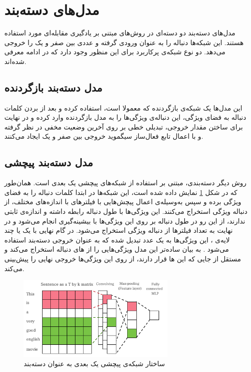  \section{مدل‌های دسته‌بند }\label{Model:Classifier}
مدل‌های دسته‌بند دو دسته‌ای در روش‌های مبتنی بر یادگیری مقابله‌ای مورد استفاده هستند. این شبکه‌ها دنباله را  به عنوان ورودی گرفته و عددی بین صفر و یک را خروجی می‌دهد. دو نوع شبکه‌ی پرکاربرد برای این منظور وجود دارد که در ادامه معرفی شده‌اند.
 \subsection{مدل‌ دسته‌بند بازگردنده}\label{Model:Classifier:RNN}
این مدل‌ها یک شبکه‌ی بازگردنده که معمولا
است، استفاده کرده و بعد از بردن کلمات دنباله به فضای ویژگی، این دنباله‌ی ویژگی‌ها را به مدل بازگردنده وارد کرده و در نهایت برای ساختن مقدار خروجی، تبدیلی خطی بر روی آخرین وضعیت مخفی در نظر گرفته و با اعمال تابع فعال‌ساز سیگموید خروجی بین صفر و یک ایجاد می‌کنند.
 \subsection{مدل‌ دسته‌بند پیچشی}\label{Model:Classifier:CNN}
روش دیگر دسته‌بندی، مبتنی بر استفاده از شبکه‌های پیچشی یک بعدی است.
همان‌طور که در شکل
\ref{Figure:DiscriminatorModel:Architecture:CNN}
نمایش داده شده است، این شبکه‌ها در ابتدا کلمات دنباله را به فضای ویژگی برده و سپس به‌وسیله‌ی اعمال پیچش‌هایی با  فیلترهای با
اندازه‌های مختلف، از دنباله ویژگی استخراج می‌کنند. این ویژگی‌ها با طول دنباله رابطه داشته و  اندازه‌ی ثابتی ندارند، از این رو در طول دنباله بر روی این ویژگی‌ها با بیشینه‌گیری 
انجام می‌شود و  در نهایت به تعداد فیلترها از دنباله ویژگی استخراج می‌شود. در گام نهایی با یک یا چند لایه‌ی
،
 این ویژگی‌ها به یک عدد تبدیل شده که به عنوان خروجی دسته‌بند استفاده می‌شود
\cite{Yoon14CNNClassifier}.
\newline
به بیان ساده‌تر این مدل ویژگی‌هایی را از 
های
دنباله استخراج می‌کند و مستقل از جایی که این
\ngram{}ها
قرار دارند، از روی این ویژگی‌ها خروجی نهایی را پیش‌بینی می‌کند.
  \begin{figure}[!htb]
  	\centering
  	\includegraphics[width=0.7\textwidth]{images/ArchitectureCNNDiscriminator.pdf} 
  	\caption[ساختار شبکه‌ی پیچشی یک بعدی به عنوان دسته‌بند]
  	{ساختار شبکه‌ی پیچشی یک بعدی به عنوان دسته‌بند 
  		\cite{Zhang2017TextGAN}
  		}
  	\label{Figure:DiscriminatorModel:Architecture:CNN}
  \end{figure}

